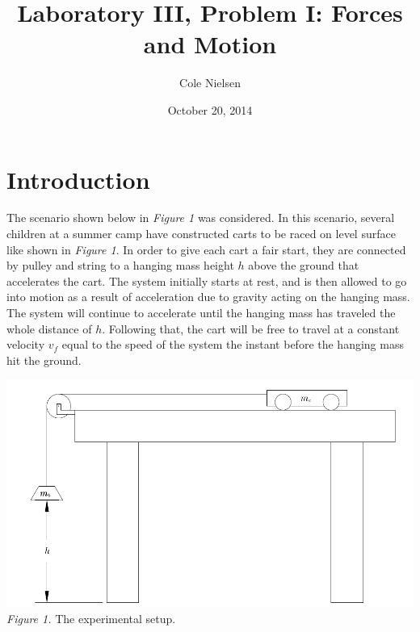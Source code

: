 \documentclass[12pt,letterpaper]{article}
\begin{document}
\title{Laboratory III, Problem I: Forces and Motion}
\author[]{Cole Nielsen}
\date{October 20, 2014} 
\pdfpagewidth 8.5in
\pdfpageheight 11in
%
%
\maketitle
%

\section{Introduction}
The scenario shown below in \textit{Figure 1} was considered. In this scenario, several children at a summer camp have constructed carts to be raced on level surface like shown in \textit{Figure 1}. In order to give each cart a fair start, they are connected by pulley and string to a hanging mass height \(h\) above the ground that accelerates the cart. The system initially starts at rest, and is then allowed to go into motion as a result of acceleration due to gravity acting on the hanging mass. The system will continue to accelerate until the hanging mass has traveled the whole distance of \(h\). Following that, the cart will be free to travel at a constant velocity \(v_f\) equal to the speed of the system the instant before the hanging mass hit the ground.
\newline
\begin{center}
\includegraphics[scale=0.4]{setup.PNG}
\newline\newline
\textit{Figure 1.} The experimental setup.
\end{center}%
\end{document}
